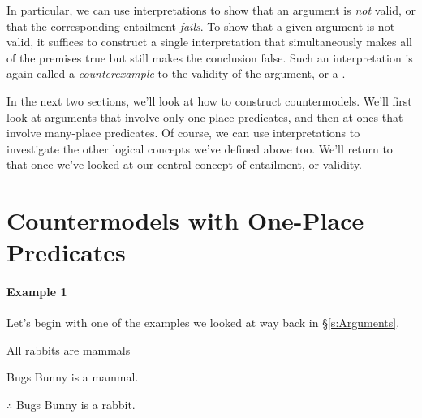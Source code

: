 In particular, we can use interpretations to show that an argument is \emph{not} valid, or that the corresponding entailment \emph{fails}.  To show that a given argument is not valid, it suffices to construct a single interpretation that simultaneously makes all of the premises true but still makes the conclusion false.  Such an interpretation is again called a \emph{counterexample} to the validity of the argument, or a .


In the next two sections, we'll look at how to construct countermodels.  We'll first look at arguments that involve only one-place predicates, and then at ones that involve many-place predicates.  Of course, we can use interpretations to investigate the other logical concepts we've defined above too.  We'll return to that once we've looked at our central concept of entailment, or validity.

\section{Countermodels with One-Place Predicates}\label{s:CountermodelOnePl}

\paragraph{Example 1} Let's begin with one of the examples we looked at way back in \S\ref{s:Arguments}.

\begin{earg}
\item[]All rabbits are mammals
\item[] Bugs Bunny is a mammal.
\item[] $\therefore$ Bugs Bunny is a rabbit.
\end{earg}

